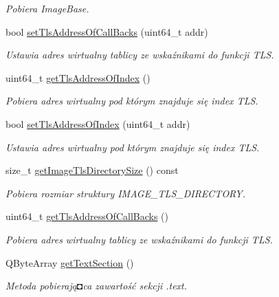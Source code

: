 \begin{DoxyCompactItemize}
\begin{DoxyCompactList}\small\item\em Pobiera Image\-Base. \end{DoxyCompactList}\item 
bool \hyperlink{class_p_e_file_a698dd8d1b169ac0b9d01ebfecd16bc51}{set\-Tls\-Address\-Of\-Call\-Backs} (uint64\-\_\-t addr)
\begin{DoxyCompactList}\small\item\em Ustawia adres wirtualny tablicy ze wskaźnikami do funkcji T\-L\-S. \end{DoxyCompactList}\item 
uint64\-\_\-t \hyperlink{class_p_e_file_aa60f615dfd569e601e3d25eaded2d3ed}{get\-Tls\-Address\-Of\-Index} ()
\begin{DoxyCompactList}\small\item\em Pobiera adres wirtualny pod którym znajduje się index T\-L\-S. \end{DoxyCompactList}\item 
bool \hyperlink{class_p_e_file_a2d6f55148b572f564bc30e881d97d9f8}{set\-Tls\-Address\-Of\-Index} (uint64\-\_\-t addr)
\begin{DoxyCompactList}\small\item\em Ustawia adres wirtualny pod którym znajduje się index T\-L\-S. \end{DoxyCompactList}\item 
size\-\_\-t \hyperlink{class_p_e_file_a45168c8ca08be4b58f79637a717135ac}{get\-Image\-Tls\-Directory\-Size} () const 
\begin{DoxyCompactList}\small\item\em Pobiera rozmiar struktury I\-M\-A\-G\-E\-\_\-\-T\-L\-S\-\_\-\-D\-I\-R\-E\-C\-T\-O\-R\-Y. \end{DoxyCompactList}\item 
uint64\-\_\-t \hyperlink{class_p_e_file_ab385de72db3e791e1477cb6593266d45}{get\-Tls\-Address\-Of\-Call\-Backs} ()
\begin{DoxyCompactList}\small\item\em Pobiera adres wirtualny tablicy ze wskaźnikami do funkcji T\-L\-S. \end{DoxyCompactList}\item 
Q\-Byte\-Array \hyperlink{class_p_e_file_a842228e192f08a70f80f564fe4ee7bc5}{get\-Text\-Section} ()
\begin{DoxyCompactList}\small\item\em Metoda pobierają◘ca zawartość sekcji .text. \end{DoxyCompactList}\item 

\end{DoxyCompactItemize}
